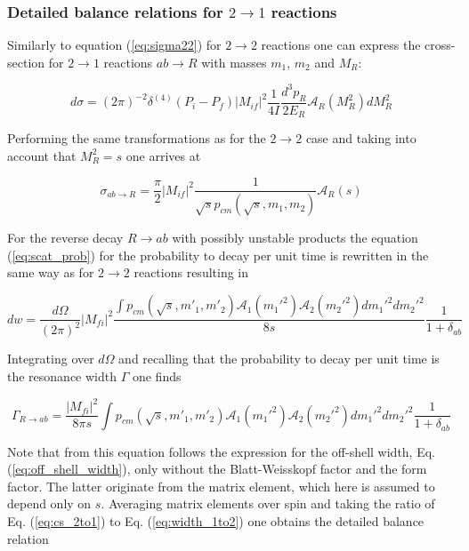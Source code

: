 \subsubsection{Detailed balance relations for $ 2\to 1$ reactions} \label{sec:detbal_2to1}

Similarly to equation (\ref{eq:sigma22}) for $2 \to 2$ reactions one can
express the cross-section for $ 2\to 1$ reactions $ab \to R$ with masses
$m_1$, $m_2$ and $M_R$:

\begin{equation} \label{eq:sigma21}
  d\sigma = (2\pi)^{-2} \delta^{(4)}(P_i-P_f) |M_{if}|^2 \frac{1}{4 I}
            \frac{d^3p_R}{2E_R} \mathcal{A}_R(M_R^2) dM_R^2
\end{equation}

Performing the same transformations as for the $2 \to 2$ case and taking into
account that $M_R^2 = s$ one arrives at

\begin{equation} \label{eq:cs_2to1}
  \sigma_{ab\to R} = \frac{\pi}{2} |M_{if}|^2 \frac{1}{\sqrt{s} p_{cm}(\sqrt{s}, m_1, m_2)} \mathcal{A}_R(s)
\end{equation}

For the reverse decay $R \to ab$ with possibly unstable products the
equation (\ref{eq:scat_prob}) for the probability to decay per unit time is
rewritten in the same way as for $2 \to 2$ reactions resulting in

\begin{equation}
  dw = \frac{d\Omega}{(2\pi)^2} |M_{fi}|^2 \frac{ \int p_{cm}(\sqrt{s}, m'_1, m'_2) \mathcal{A}_1(m_1'^2) \mathcal{A}_2(m_2'^2) dm_1'^2 dm_2'^2 }{8 s}
       \frac{1}{1+\delta_{ab}}
\end{equation}

Integrating over $d\Omega$ and recalling that the probability to decay per unit
time is the resonance width $\Gamma$ one finds

\begin{equation} \label{eq:width_1to2}
  \Gamma_{R \to ab} = \frac{|M_{fi}|^2}{8\pi s} \int p_{cm}(\sqrt{s}, m'_1, m'_2) \mathcal{A}_1(m_1'^2) \mathcal{A}_2(m_2'^2) dm_1'^2 dm_2'^2
           \frac{1}{1+\delta_{ab}}
\end{equation}

Note that from this equation follows the expression for the off-shell width,
Eq. (\ref{eq:off_shell_width}), only without the Blatt-Weisskopf factor and the
form factor.  The latter originate from the matrix element, which here is
assumed to depend only on $s$. Averaging matrix elements over spin and
taking the ratio of Eq. (\ref{eq:cs_2to1}) to Eq. (\ref{eq:width_1to2}) one
obtains the detailed balance relation

